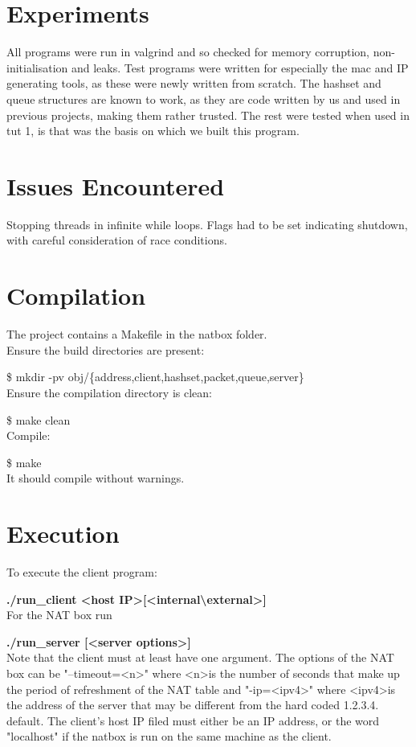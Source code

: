 \documentclass{article}
\begin{document}
\section{Experiments}
All programs were run in valgrind and so checked for memory corruption, non-initialisation and leaks.  Test programs were written for especially the mac and IP generating tools, as these were newly written from scratch.  The hashset and queue structures are known to work, as they are code written by us and used in previous projects, making them rather trusted.  The rest were tested when used in tut 1, is that was the basis on which we built this program.  

\section{Issues Encountered}
Stopping threads in infinite while loops.  Flags had to be set indicating shutdown, with careful consideration of race conditions.  

\section{Compilation}

The project contains a Makefile in the natbox folder. 
\\Ensure the build directories are present:  

\$ mkdir -pv obj/\{address,client,hashset,packet,queue,server\} 
\\Ensure the compilation directory is clean:

\$ make clean
\\Compile:

\$ make
\\It should compile without warnings. 

\section{Execution}

To execute the client program:

\textbf{./run\_client \textless host IP\textgreater [\textless internal\textbackslash external\textgreater]}
\\For the NAT box run

\textbf{./run\_server [\textless server options\textgreater]}
\\Note that the client must at least have one argument. The options of the NAT box can be "--timeout=\textless n\textgreater" where \textless n\textgreater  is the number of seconds that make up the period of refreshment of the NAT table and  "-ip=\textless ipv4\textgreater" where \textless ipv4\textgreater  is the address of the server that may be different from the hard coded 1.2.3.4. default.  The client's host IP filed must either be an IP address, or the word "localhost" if the natbox is run on the same machine as the client.  
\end{document}
